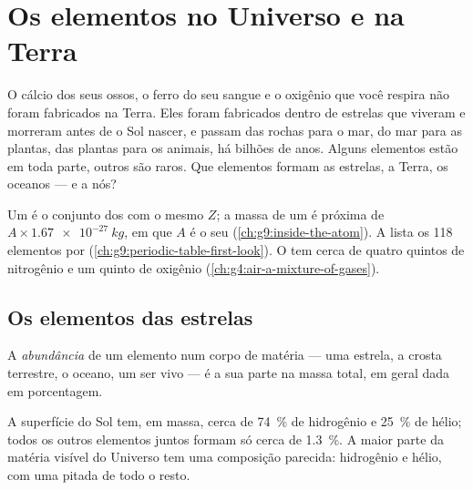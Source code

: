 \chapter{Os elementos no Universo e na Terra}\label{ch:g9:elements-universe-earth}

O cálcio dos seus ossos, o ferro do seu sangue e o oxigênio que você
respira não foram fabricados na Terra. Eles foram fabricados dentro de
estrelas que viveram e morreram antes de o Sol nascer, e passam das
rochas para o mar, do mar para as plantas, das plantas para os animais,
há bilhões de anos. Alguns elementos estão em toda parte, outros são
raros. Que elementos formam as estrelas, a Terra, os oceanos --- e a
nós?

\begin{recall}
Um  é o conjunto dos  com o mesmo 
$Z$; a massa de um  é próxima de $A \times \qty{1.67e-27}{kg}$, em
que $A$ é o seu  (\cref{ch:g9:inside-the-atom}). A  lista os 118 elementos por 
(\cref{ch:g9:periodic-table-first-look}). O  tem cerca de quatro
quintos de nitrogênio e um quinto de oxigênio
(\cref{ch:g4:air-a-mixture-of-gases}).
\end{recall}

\section{Os elementos das estrelas}

\begin{definition}[Abundância]\label{def:g9:elements-universe-earth:abundance}
A \emph{abundância} de um elemento num corpo de
matéria --- uma estrela, a crosta terrestre, o oceano, um ser vivo --- é
a sua parte na massa total, em geral dada em porcentagem.
\end{definition}

\begin{proposition}\label{prop:g9:elements-universe-earth:sun}
A superfície do Sol tem, em massa, cerca de \qty{74}{\percent} de
hidrogênio e \qty{25}{\percent} de hélio; todos os outros elementos
juntos formam só cerca de \qty{1.3}{\percent}. A maior parte da matéria
visível do Universo tem uma composição parecida: hidrogênio e hélio, com
uma pitada de todo o resto.
\end{proposition}

